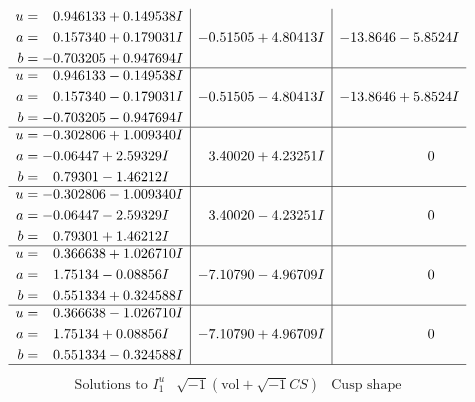 \documentclass[1p]{elsarticle_modified}
\theoremstyle{definition}
\newcommand{\I}{\sqrt{-1}}
\begin{document}
$$\begin{array}{c|c|c}
\begin{aligned}
u &= \phantom{-}0.946133 + 0.149538 I \\
a &= \phantom{-}0.157340 + 0.179031 I \\
b &= -0.703205 + 0.947694 I\end{aligned}
 & -0.51505 + 4.80413 I & -13.8646 - 5.8524 I \\ \hline\begin{aligned}
u &= \phantom{-}0.946133 - 0.149538 I \\
a &= \phantom{-}0.157340 - 0.179031 I \\
b &= -0.703205 - 0.947694 I\end{aligned}
 & -0.51505 - 4.80413 I & -13.8646 + 5.8524 I \\ \hline\begin{aligned}
u &= -0.302806 + 1.009340 I \\
a &= -0.06447 + 2.59329 I \\
b &= \phantom{-}0.79301 - 1.46212 I\end{aligned}
 & \phantom{-}3.40020 + 4.23251 I & \phantom{-0.000000 } 0 \\ \hline\begin{aligned}
u &= -0.302806 - 1.009340 I \\
a &= -0.06447 - 2.59329 I \\
b &= \phantom{-}0.79301 + 1.46212 I\end{aligned}
 & \phantom{-}3.40020 - 4.23251 I & \phantom{-0.000000 } 0 \\ \hline\begin{aligned}
u &= \phantom{-}0.366638 + 1.026710 I \\
a &= \phantom{-}1.75134 - 0.08856 I \\
b &= \phantom{-}0.551334 + 0.324588 I\end{aligned}
 & -7.10790 - 4.96709 I & \phantom{-0.000000 } 0 \\ \hline\begin{aligned}
u &= \phantom{-}0.366638 - 1.026710 I \\
a &= \phantom{-}1.75134 + 0.08856 I \\
b &= \phantom{-}0.551334 - 0.324588 I\end{aligned}
 & -7.10790 + 4.96709 I & \phantom{-0.000000 } 0\\
 \hline 
 \end{array}$$\newpage$$\begin{array}{c|c|c}  
\text{Solutions to }I^u_{1}& \I (\text{vol} + \sqrt{-1}CS) & \text{Cusp shape}\\
 \hline 
\begin{aligned}

\end{aligned}
\end{array}$$
\end{document}
